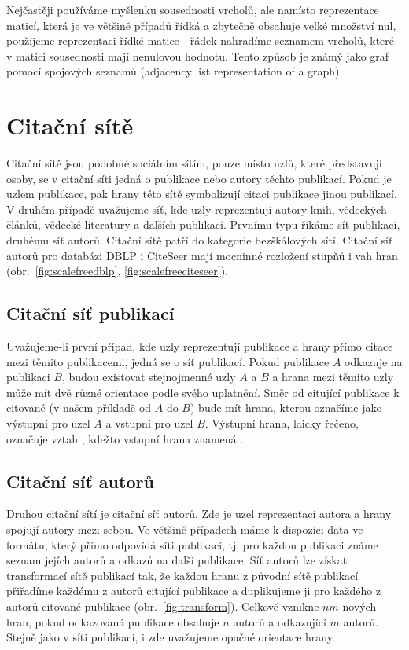 \documentclass{bakalarka}
\begin{document}
Nejčastěji používáme myšlenku sousednosti vrcholů, ale namísto reprezentace
maticí, která je ve většině případů řídká a zbytečně obsahuje velké množství
nul, použijeme reprezentaci řídké matice - řádek nahradíme seznamem vrcholů,
které v matici sousednosti mají nenulovou hodnotu. Tento způsob je známý jako
graf pomocí spojových seznamů (adjacency list representation of a graph).


\section{Citační sítě}
Citační sítě jsou podobné sociálním sítím, pouze místo uzlů, které představují
osoby, se v citační síti jedná o publikace nebo autory těchto publikací. Pokud
je uzlem publikace, pak hrany této sítě symbolizují citaci publikace jinou
publikací. V druhém případě uvažujeme síť, kde uzly reprezentují autory knih,
vědeckých článků, vědecké literatury a dalších publikací. Prvnímu typu říkáme
síť publikací, druhému síť autorů. Citační sítě patří do kategorie bezškálových
sítí. Citační síť autorů pro databázi DBLP i CiteSeer mají mocninné rozložení
stupňů i vah hran (obr.~\ref{fig:scalefreedblp}, \ref{fig:scalefreeciteseer}).

\subsection{Citační síť publikací}
Uvažujeme-li první případ, kde uzly reprezentují publikace a hrany přímo citace
mezi těmito publikacemi, jedná se o síť publikací. Pokud publikace $A$ odkazuje
na publikaci $B$, budou existovat stejnojmenné uzly $A$ a $B$ a hrana mezi
těmito uzly může mít dvě různé orientace podle svého uplatnění. Směr od
citující publikace k citované (v našem příkladě od $A$ do $B$) bude mít hrana,
kterou označíme jako výstupní pro uzel $A$ a vstupní pro uzel $B$.  Výstupní
hrana, laicky řečeno, označuje vztah , kdežto vstupní hrana znamená
.

\subsection{Citační síť autorů}
Druhou citační sítí je citační síť autorů. Zde je uzel reprezentací autora a
hrany spojují autory mezi sebou. Ve většině případech máme k dispozici data ve
formátu, který přímo odpovídá síti publikací, tj. pro každou publikaci známe
seznam jejích autorů a odkazů na další publikace. Síť autorů lze získat
transformací sítě publikací tak, že každou hranu z původní sítě publikací
přiřadíme každému z autorů citující publikace a duplikujeme ji pro každého z
autorů citované publikace (obr.~\ref{fig:transform}). Celkově vznikne $nm$ nových hran, pokud odkazovaná
publikace obsahuje $n$ autorů a odkazující $m$ autorů. Stejně jako v síti
publikací, i zde uvažujeme opačné orientace hrany.
\end{document}

